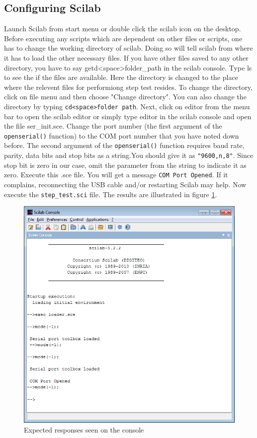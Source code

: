 \documentclass[12pt]{report}
\begin{document}
\subsection{Configuring Scilab}
\label{scilab_sbhs}
Launch Scilab from start menu or double click the scilab icon on the desktop. Before executing any scripts which are dependent on other files or scripts, one has to change the working directory of scilab. Doing so will tell scilab from where it has to load the other necessary files. If you have other files saved to any other directory, you have to say {\ttfamily  getd<space>folder\_path} in the scilab console. Type {\ttfamily ls} to see the if the files are available. Here the directory is changed to the place where the relevent files for performiong step test resides. To change the directory, click on file menu and then choose "Change directory". You can also change the directory by typing {\tt cd<space>folder path}. Next, click on {\ttfamily editor} from the menu bar to open the scilab editor or simply type {\ttfamily editor} in the scilab console and open the file {\ttfamily ser\_init.sce}. Change the port number (the first argument of the {\tt openserial()} function) to the COM port number that you have noted down before. The second argument of the {\tt openserial()} function requires baud rate, parity, data bits and stop bits as a string.You should give it as {\tt "9600,n,8"}. Since stop bit is zero in our case, omit the parameter from the string to indicate it as zero. Execute this .sce file. You will get a message {\tt COM Port Opened}. If it complains, reconnecting the USB cable and/or restarting Scilab may help. Now execute the {\tt step\_test.sci} file.  The results are illustrated in figure \ref{loader}. 

\begin{figure}
\centering
\includegraphics[width=0.7\linewidth]{console.png}
\caption{Expected responses seen on the console}
\label{loader}
\end{figure}
\end{document}
